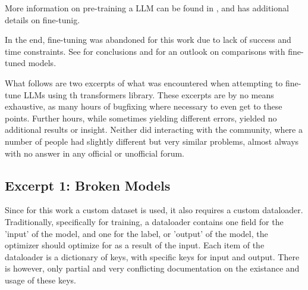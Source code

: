 More information on pre-training a \gls{LLM} can be found in , and  has additional details on fine-tunig.

In the end, fine-tuning was abandoned for this work due to lack of success and time constraints. See  for conclusions and  for an outlook on comparisons with fine-tuned models.

What follows are two excerpts of what was encountered when attempting to fine-tune \glspl{LLM} using th \gls{transformers} library.
These excerpts are by no means exhaustive, as many hours of bugfixing where necessary to even get to these points.
Further hours, while sometimes yielding different errors, yielded no additional results or insight.
Neither did interacting with the community, where a number of people had slightly different but very similar problems, almost always with no answer in any official or unofficial forum.

% 


\subsection{Excerpt 1: Broken Models}\label{sub:brokenft}
Since for this work a custom dataset is used, it also requires a custom dataloader.
Traditionally, specifically for training, a dataloader contains one field for the 'input' of the model, and one for the label, or 'output' of the model, the optimizer should optimize for as a result of the input.
Each item of the dataloader is a dictionary of keys, with specific keys for input and output.
There is however, only partial and very conflicting documentation on the existance and usage of these keys.

